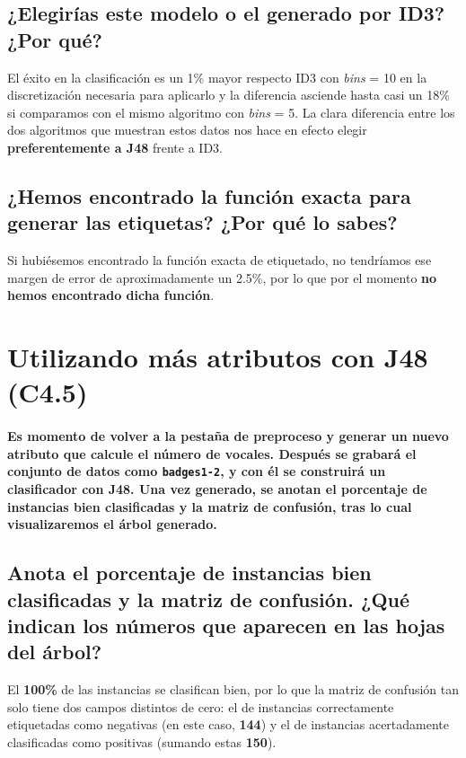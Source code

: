 \documentclass[12pt]{article}
\begin{document}
\subsection*{\small ¿Elegirías este modelo o el generado por ID3? ¿Por qué?}

El éxito en la clasificación es un 1\% mayor respecto ID3 con \emph{bins} = 10 en la discretización necesaria para aplicarlo y la diferencia asciende hasta casi un 18\% si comparamos con el mismo algoritmo con \emph{bins} = 5. La clara diferencia entre los dos algoritmos que muestran estos datos nos hace en efecto elegir \textbf{preferentemente a J48} frente a ID3.

\subsection*{\small ¿Hemos encontrado la función exacta para generar las etiquetas? ¿Por qué lo sabes?}

Si hubiésemos encontrado la función exacta de etiquetado, no tendríamos ese margen de error de aproximadamente un 2.5\%, por lo que por el momento \textbf{no hemos encontrado dicha función}.

\newpage

\section{Utilizando más atributos con J48 (C4.5)}

\paragraph{\small Es momento de volver a la pestaña de preproceso y generar un nuevo atributo que calcule el número de vocales. Después se grabará el conjunto de datos como \texttt{badges1-2}, y con él se construirá un clasificador con J48. Una vez generado, se anotan el porcentaje de instancias bien clasificadas y la matriz de confusión, tras lo cual visualizaremos el árbol generado.}

\subsection*{\small Anota el porcentaje de instancias bien clasificadas y la matriz de confusión. ¿Qué indican los números que aparecen en las hojas del árbol?}

El \textbf{100\%} de las instancias se clasifican bien, por lo que la matriz de confusión tan solo tiene dos campos distintos de cero: el de instancias correctamente etiquetadas como negativas (en este caso, \textbf{144}) y el de instancias acertadamente clasificadas como positivas (sumando estas \textbf{150}).
\end{document}
